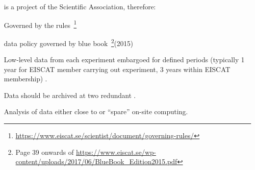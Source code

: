 \begin{frame}[fragile,t]
\vspace{\mytopbit}
\bitm
\item{\ED is a project of the \EC Scientific Association, therefore:}
  \item{Governed by the \EC rules~\footnote{\url{https://www.eiscat.se/scientist/document/governing-rules/}}}
  \item{\EC data policy governed by blue book~\footnote{{Page 39 onwards of} \tiny \url{https://www.eiscat.se/wp-content/uploads/2017/06/BlueBook_Edition2015.pdf}}(2015)}
  \item{Low-level data from each experiment embargoed for defined periods (typically 1 year for EISCAT member carrying out experiment, 3 years within EISCAT membership) .}
  \item{Data should be archived at two redundant .}
  \item{Analysis of data either close to  or ``spare'' on-site computing.}
\eitm
\end{frame}

